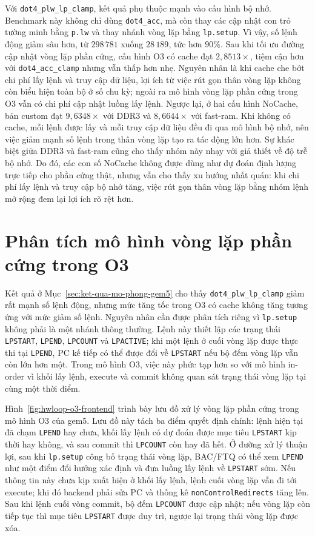 \documentclass[../DoAn.tex]{subfiles}
\begin{document}
Với \texttt{dot4\_plw\_lp\_clamp}, kết quả phụ thuộc mạnh vào cấu hình bộ nhớ. Benchmark này không chỉ dùng \texttt{dot4\_acc}, mà còn thay các cập nhật con trỏ tường minh bằng \texttt{p.lw} và thay nhánh vòng lặp bằng \texttt{lp.setup}. Vì vậy, số lệnh động giảm sâu hơn, từ \(298\,781\) xuống \(28\,189\), tức hơn \(90\%\). Sau khi tối ưu đường cập nhật vòng lặp phần cứng, cấu hình O3 có cache đạt \(2{,}8513\times\), tiệm cận hơn với \texttt{dot4\_acc\_clamp} nhưng vẫn thấp hơn nhẹ. Nguyên nhân là khi cache che bớt chi phí lấy lệnh và truy cập dữ liệu, lợi ích từ việc rút gọn thân vòng lặp không còn biểu hiện toàn bộ ở số chu kỳ; ngoài ra mô hình vòng lặp phần cứng trong O3 vẫn có chi phí cập nhật luồng lấy lệnh. Ngược lại, ở hai cấu hình NoCache, bản custom đạt \(9{,}6348\times\) với DDR3 và \(8{,}6644\times\) với fast-ram. Khi không có cache, mỗi lệnh được lấy và mỗi truy cập dữ liệu đều đi qua mô hình bộ nhớ, nên việc giảm mạnh số lệnh trong thân vòng lặp tạo ra tác động lớn hơn. Sự khác biệt giữa DDR3 và fast-ram cũng cho thấy nhóm này nhạy với giả thiết về độ trễ bộ nhớ. Do đó, các con số NoCache không được dùng như dự đoán định lượng trực tiếp cho phần cứng thật, nhưng vẫn cho thấy xu hướng nhất quán: khi chi phí lấy lệnh và truy cập bộ nhớ tăng, việc rút gọn thân vòng lặp bằng nhóm lệnh mở rộng đem lại lợi ích rõ rệt hơn.

\section{Phân tích mô hình vòng lặp phần cứng trong O3}
\label{sec:phan-tich-hwloop-o3}

Kết quả ở Mục~\ref{sec:ket-qua-mo-phong-gem5} cho thấy \texttt{dot4\_plw\_lp\_clamp} giảm rất mạnh số lệnh động, nhưng mức tăng tốc trong O3 có cache không tăng tương ứng với mức giảm số lệnh. Nguyên nhân cần được phân tích riêng vì \texttt{lp.setup} không phải là một nhánh thông thường. Lệnh này thiết lập các trạng thái \texttt{LPSTART}, \texttt{LPEND}, \texttt{LPCOUNT} và \texttt{LPACTIVE}; khi một lệnh ở cuối vòng lặp được thực thi tại \texttt{LPEND}, PC kế tiếp có thể được đổi về \texttt{LPSTART} nếu bộ đếm vòng lặp vẫn còn lớn hơn một. Trong mô hình O3, việc này phức tạp hơn so với mô hình in-order vì khối lấy lệnh, execute và commit không quan sát trạng thái vòng lặp tại cùng một thời điểm.

Hình~\ref{fig:hwloop-o3-frontend} trình bày lưu đồ xử lý vòng lặp phần cứng trong mô hình O3 của gem5. Lưu đồ này tách ba điểm quyết định chính: lệnh hiện tại đã chạm \texttt{LPEND} hay chưa, khối lấy lệnh có dự đoán được mục tiêu \texttt{LPSTART} kịp thời hay không, và sau commit thì \texttt{LPCOUNT} còn hay đã hết. Ở đường xử lý thuận lợi, sau khi \texttt{lp.setup} công bố trạng thái vòng lặp, BAC/FTQ có thể xem \texttt{LPEND} như một điểm đổi hướng xác định và đưa luồng lấy lệnh về \texttt{LPSTART} sớm. Nếu thông tin này chưa kịp xuất hiện ở khối lấy lệnh, lệnh cuối vòng lặp vẫn đi tới execute; khi đó backend phải sửa PC và thống kê \texttt{nonControlRedirects} tăng lên. Sau khi lệnh cuối vòng commit, bộ đếm \texttt{LPCOUNT} được cập nhật; nếu vòng lặp còn tiếp tục thì mục tiêu \texttt{LPSTART} được duy trì, ngược lại trạng thái vòng lặp được xóa.
\end{document}
